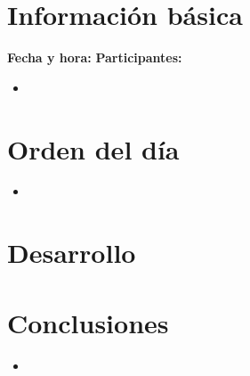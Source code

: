 \documentclass[a4paper]{article}
\begin{document}
\section{Información básica}
\textbf{Fecha y hora: }
\newline
\textbf{Participantes:}
\begin{itemize}
	\item 
\end{itemize}
\section{Orden del día}
\begin{itemize}
\item 
\end{itemize}
\section{Desarrollo}
\section{Conclusiones}
\begin{itemize}
\item 
\end{itemize}
\end{document}
